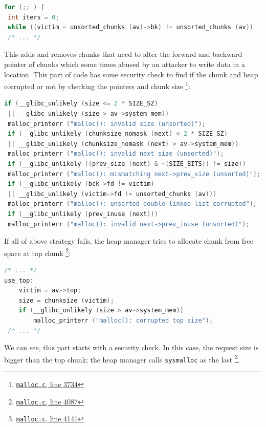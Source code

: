 \documentclass{masterthesis}
\begin{document}
\begin{lstlisting}[language=c]
for (;; ) {
 int iters = 0;
 while ((victim = unsorted_chunks (av)->bk) != unsorted_chunks (av))
 /* ... */
\end{lstlisting}
This adds and removes chunks that need to alter the forward and backward pointer of chunks which some times abused by an attacker to write data in a location. This part of code has some security check to find if the chunk and heap corrupted or not by checking the pointers and chunk size \footnote{\href{https://sourceware.org/git/?p=glibc.git;a=blob;f=malloc/malloc.c;h=f7cd29bc2f93e1082ee77800bd64a4b2a2897055;hb=9ea3686266dca3f004ba874745a4087a89682617\#l3734}{\texttt{malloc.c}, line 3734}}:
\begin{lstlisting}[language=c,frame=tlrb]
 if (__glibc_unlikely (size <= 2 * SIZE_SZ)
 || __glibc_unlikely (size > av->system_mem))
 malloc_printerr ("malloc(): invalid size (unsorted)");
 if (__glibc_unlikely (chunksize_nomask (next) < 2 * SIZE_SZ)
 || __glibc_unlikely (chunksize_nomask (next) > av->system_mem))
 malloc_printerr ("malloc(): invalid next size (unsorted)");
 if (__glibc_unlikely ((prev_size (next) & ~(SIZE_BITS)) != size))
 malloc_printerr ("malloc(): mismatching next->prev_size (unsorted)");
 if (__glibc_unlikely (bck->fd != victim)
 || __glibc_unlikely (victim->fd != unsorted_chunks (av)))
 malloc_printerr ("malloc(): unsorted double linked list corrupted");
 if (__glibc_unlikely (prev_inuse (next)))
 malloc_printerr ("malloc(): invalid next->prev_inuse (unsorted)");
\end{lstlisting}

If all of above strategy fails, the heap manager tries to allocate chunk from free space at top chunk \footnote{\href{https://sourceware.org/git/?p=glibc.git;a=blob;f=malloc/malloc.c;h=f7cd29bc2f93e1082ee77800bd64a4b2a2897055;hb=9ea3686266dca3f004ba874745a4087a89682617\#l4087}{\texttt{malloc.c}, line 4087}}:

\begin{lstlisting}[language=c,frame=tlrb]
 /* ... */
use_top:
	victim = av->top;
	size = chunksize (victim);
	if (__glibc_unlikely (size > av->system_mem))
		malloc_printerr ("malloc(): corrupted top size");
 /* ... */
\end{lstlisting}

We can see, this part starts with a security check. In this case, the request size is bigger than the top chunk; the heap manager calls \lstinline{sysmalloc} as the last \footnote{\href{https://sourceware.org/git/?p=glibc.git;a=blob;f=malloc/malloc.c;h=f7cd29bc2f93e1082ee77800bd64a4b2a2897055;hb=9ea3686266dca3f004ba874745a4087a89682617\#l4141}{\texttt{malloc.c}, line 4141}}.
\end{document}
